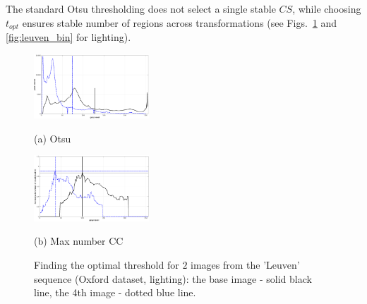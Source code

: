 \documentclass{article}
\begin{document}
The standard Otsu thresholding does not select a single stable $CS$, while choosing $t_{opt}$ ensures stable number of regions across transformations (see Figs.~\ref{fig:binary_hist} and \ref{fig:leuven_bin} for lighting).
\begin{figure}[htb]

\begin{minipage}[b]{0.49\linewidth}
  \centering
  \centerline{\includegraphics[width=4.3cm]{./Figs/hist_otsu_leuven_1_4}}
  \centerline{(a) Otsu}\medskip
\end{minipage}
\hfill
\begin{minipage}[b]{0.49\linewidth}
  \centering
  \centerline{\includegraphics[width=4.3cm]{./Figs/hist_numcc_leuven_1_4}}
\centerline{(b) Max number CC}\medskip
\end{minipage}
\hfill
\vspace{-0.5cm}
\caption{Finding the optimal threshold for $2$ images from the 'Leuven' sequence 
(Oxford dataset, lighting): the base image - solid black line, the 4th image - dotted blue line.}
\label{fig:binary_hist}
%
\end{figure}
\end{document}
